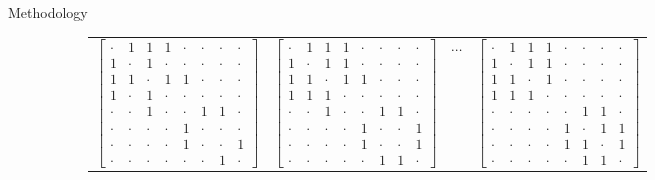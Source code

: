 \documentclass[12pt]{amsart}
\begin{document}
\begin{section}{Methodology}
\begin{figure}
\begin{subfigure}[c]{1\textwidth}
    \end{subfigure}
    \begin{subfigure}[c]{1\textwidth}
        \begin{tabular}{llll}
            $\begin{bmatrix}
                \cdot & 1 & 1 & 1 & \cdot & \cdot & \cdot & \cdot\\
                1 & \cdot & 1 & \cdot & \cdot & \cdot & \cdot & \cdot\\
                1 & 1 & \cdot & 1 & 1 & \cdot & \cdot & \cdot\\
                1 & \cdot & 1 & \cdot & \cdot & \cdot & \cdot & \cdot\\
                \cdot & \cdot & 1 & \cdot & \cdot & 1 & 1 & \cdot\\
                \cdot & \cdot & \cdot & \cdot & 1 & \cdot & \cdot & \cdot\\
                \cdot & \cdot & \cdot & \cdot & 1 & \cdot & \cdot & 1\\
                \cdot & \cdot & \cdot & \cdot & \cdot & \cdot & 1 & \cdot
            \end{bmatrix}$
            &
            $\begin{bmatrix}
                \cdot & 1 & 1 & 1 & \cdot & \cdot & \cdot & \cdot\\
                1 & \cdot & 1 & 1 & \cdot & \cdot & \cdot & \cdot\\
                1 & 1 & \cdot & 1 & 1 & \cdot & \cdot & \cdot\\
                1 & 1 & 1 & \cdot & \cdot & \cdot & \cdot & \cdot\\
                \cdot & \cdot & 1 & \cdot & \cdot & 1 & 1 & \cdot\\
                \cdot & \cdot & \cdot & \cdot & 1 & \cdot & \cdot & 1\\
                \cdot & \cdot & \cdot & \cdot & 1 & \cdot & \cdot & 1\\
                \cdot & \cdot & \cdot & \cdot & \cdot & 1 & 1 & \cdot
            \end{bmatrix}$
            &
            $\cdots$
            &
            $\begin{bmatrix}
                \cdot & 1 & 1 & 1 & \cdot & \cdot & \cdot & \cdot\\
                1 & \cdot & 1 & 1 & \cdot & \cdot & \cdot & \cdot\\
                1 & 1 & \cdot & 1 & \cdot & \cdot & \cdot & \cdot\\
                1 & 1 & 1 & \cdot & \cdot & \cdot & \cdot & \cdot\\
                \cdot & \cdot & \cdot & \cdot & \cdot & 1 & 1 & \cdot\\
                \cdot & \cdot & \cdot & \cdot & 1 & \cdot & 1 & 1\\
                \cdot & \cdot & \cdot & \cdot & 1 & 1 & \cdot & 1\\
                \cdot & \cdot & \cdot & \cdot & \cdot & 1 & 1 & \cdot
            \end{bmatrix}$
            

\end{tabular}
\end{subfigure}
\end{figure}
\end{section}
\end{document}
